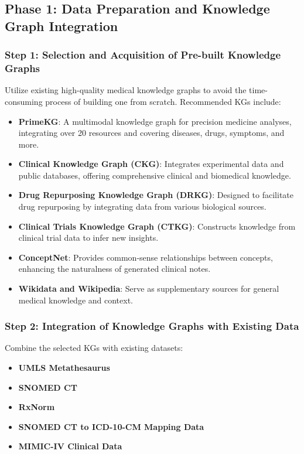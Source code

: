 \documentclass[12pt, a4paper]{article}
\begin{document}
\subsection{Phase 1: Data Preparation and Knowledge Graph Integration}

\subsubsection{Step 1: Selection and Acquisition of Pre-built Knowledge Graphs}

Utilize existing high-quality medical knowledge graphs to avoid the time-consuming process of building one from scratch. Recommended KGs include:

\begin{itemize}
    \item \textbf{PrimeKG}: A multimodal knowledge graph for precision medicine analyses, integrating over 20 resources and covering diseases, drugs, symptoms, and more.
    \item \textbf{Clinical Knowledge Graph (CKG)}: Integrates experimental data and public databases, offering comprehensive clinical and biomedical knowledge.
    \item \textbf{Drug Repurposing Knowledge Graph (DRKG)}: Designed to facilitate drug repurposing by integrating data from various biological sources.
    \item \textbf{Clinical Trials Knowledge Graph (CTKG)}: Constructs knowledge from clinical trial data to infer new insights.
    \item \textbf{ConceptNet}: Provides common-sense relationships between concepts, enhancing the naturalness of generated clinical notes.
    \item \textbf{Wikidata and Wikipedia}: Serve as supplementary sources for general medical knowledge and context.
\end{itemize}

\subsubsection{Step 2: Integration of Knowledge Graphs with Existing Data}

Combine the selected KGs with existing datasets:

\begin{itemize}
    \item \textbf{UMLS Metathesaurus}
    \item \textbf{SNOMED CT}
    \item \textbf{RxNorm}
    \item \textbf{SNOMED CT to ICD-10-CM Mapping Data}
    \item \textbf{MIMIC-IV Clinical Data}
\end{itemize}
\end{document}
